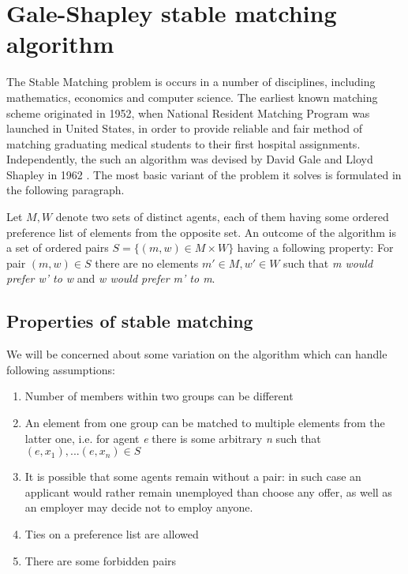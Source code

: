 
\chapter{Gale-Shapley stable matching algorithm}
\ifpdf
    \graphicspath{{Chapter1/Chapter1Figs/PNG/}{Chapter1/Chapter1Figs/PDF/}{Chapter1/Chapter1Figs/}}
\else
    \graphicspath{{Chapter1/Chapter1Figs/EPS/}{Chapter1/Chapter1Figs/}}
\fi
{}
The Stable Matching problem is occurs in a number of disciplines, including mathematics, economics and computer science. The earliest known matching scheme originated in 1952, when National Resident Matching Program was launched in United States, in order to provide reliable and fair method of matching graduating medical students to their first hospital assignments. \cite{nrmp} Independently, the such an algorithm was devised by David Gale and Lloyd Shapley in 1962 \cite{DBLP:books/daglib/0015106}. The most basic variant of the problem it solves is formulated in the following paragraph.

Let ${\mathit{M, W}}$ denote two sets of distinct agents, each of them having some ordered preference list of elements from the opposite set. An outcome of the algorithm is a set of ordered pairs ${\mathit{S = \{(m, w) \in M \times W\}}}$ having a following property:
For pair ${\mathit{(m, w) \in S}}$ there are no elements ${\mathit{m' \in M, w' \in W}}$ such that \textit{m would prefer w' to w} and \textit{w would prefer m' to m}.

\section{Properties of stable matching}

We will be concerned about some variation on the algorithm which can handle following assumptions:
\begin{enumerate}
	\item Number of members within two groups can be different
	\item An element from one group can be matched to multiple elements from the latter one, i.e. for agent \textit{e} there is some arbitrary \textit{n} such that ${\mathit{(e, x_1), ... (e, x_n)  \in S}}$
	\item It is possible that some agents remain without a pair: in such case an applicant would rather remain unemployed than choose any offer, as well as an employer may decide not to employ anyone.
	\item Ties on a preference list are allowed
	\item There are some forbidden pairs
\end{enumerate}


